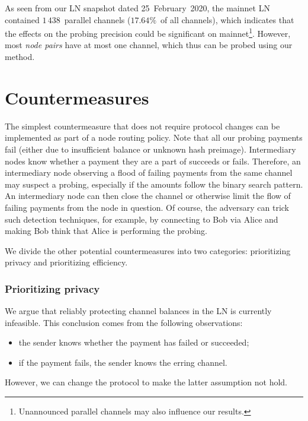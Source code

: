 As seen from our LN snapshot dated 25~February~2020, the mainnet LN contained $1\,438$~parallel channels ($17.64\%$~of all channels), which indicates that the effects on the probing precision could be significant on mainnet\footnote{Unannounced parallel channels may also influence our results.}.
However, most \textit{node pairs} have at most one channel, which thus can be probed using our method.


\section{Countermeasures}

The simplest countermeasure that does not require protocol changes can be implemented as part of a node routing policy.
Note that all our probing payments fail (either due to insufficient balance or unknown hash preimage). 
Intermediary nodes know whether a payment they are a part of succeeds or fails.
Therefore, an intermediary node observing a flood of failing payments from the same channel may suspect a probing, especially if the amounts follow the binary search pattern.
An intermediary node can then close the channel or otherwise limit the flow of failing payments from the node in question.
Of course, the adversary can trick such detection techniques, for example, by connecting to Bob via Alice and making Bob think that Alice is performing the probing.

We divide the other potential countermeasures into two categories: prioritizing privacy and prioritizing efficiency.


\subsubsection*{Prioritizing privacy}

We argue that reliably protecting channel balances in the LN is currently infeasible.
This conclusion comes from the following observations:
\begin{itemize}
	\item the sender knows whether the payment has failed or succeeded;
	\item if the payment fails, the sender knows the erring channel.
\end{itemize}
However, we can change the protocol to make the latter assumption not hold.

